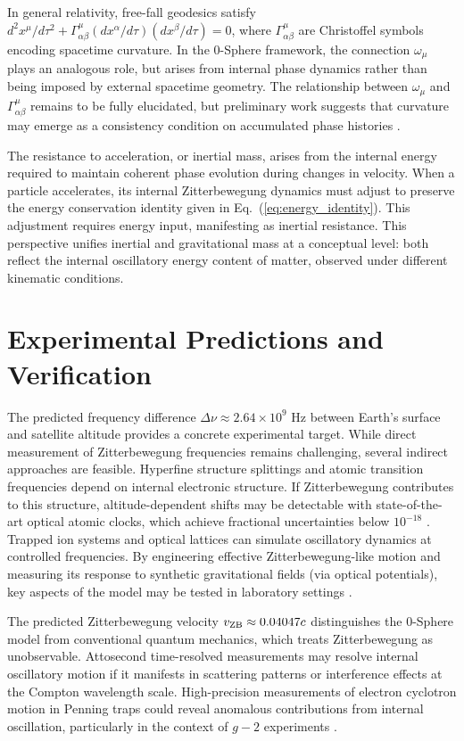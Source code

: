 \documentclass[%
 reprint,
 amsmath,amssymb,
 aps,
 prb,
]{revtex4-2}
\numberwithin{equation}{section}
\begin{document}
In general relativity, free-fall geodesics satisfy $d^2 x^\mu/d\tau^2 + \Gamma^\mu_{\alpha\beta}(dx^\alpha/d\tau)(dx^\beta/d\tau) = 0$, where $\Gamma^\mu_{\alpha\beta}$ are Christoffel symbols encoding spacetime curvature. In the 0-Sphere framework, the connection $\omega_\mu$ plays an analogous role, but arises from internal phase dynamics rather than being imposed by external spacetime geometry. The relationship between $\omega_\mu$ and $\Gamma^\mu_{\alpha\beta}$ remains to be fully elucidated, but preliminary work suggests that curvature may emerge as a consistency condition on accumulated phase histories \cite{Hanamura2026Curvature}.

The resistance to acceleration, or inertial mass, arises from the internal energy required to maintain coherent phase evolution during changes in velocity. When a particle accelerates, its internal Zitterbewegung dynamics must adjust to preserve the energy conservation identity given in Eq.~(\ref{eq:energy_identity}). This adjustment requires energy input, manifesting as inertial resistance. This perspective unifies inertial and gravitational mass at a conceptual level: both reflect the internal oscillatory energy content of matter, observed under different kinematic conditions.

\section{Experimental Predictions and Verification}
\label{sec:experimental}

The predicted frequency difference $\Delta\nu \approx 2.64 \times 10^9$ Hz between Earth's surface and satellite altitude provides a concrete experimental target. While direct measurement of Zitterbewegung frequencies remains challenging, several indirect approaches are feasible. Hyperfine structure splittings and atomic transition frequencies depend on internal electronic structure. If Zitterbewegung contributes to this structure, altitude-dependent shifts may be detectable with state-of-the-art optical atomic clocks, which achieve fractional uncertainties below $10^{-18}$ \cite{Ludlow2015}. Trapped ion systems and optical lattices can simulate oscillatory dynamics at controlled frequencies. By engineering effective Zitterbewegung-like motion and measuring its response to synthetic gravitational fields (via optical potentials), key aspects of the model may be tested in laboratory settings \cite{Gerritsma2010}.

The predicted Zitterbewegung velocity $v_{\rm ZB} \approx 0.04047c$ distinguishes the 0-Sphere model from conventional quantum mechanics, which treats Zitterbewegung as unobservable. Attosecond time-resolved measurements may resolve internal oscillatory motion if it manifests in scattering patterns or interference effects at the Compton wavelength scale. High-precision measurements of electron cyclotron motion in Penning traps could reveal anomalous contributions from internal oscillation, particularly in the context of $g-2$ experiments \cite{Gabrielse2023}.
\end{document}
